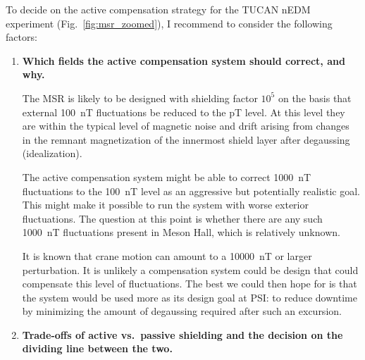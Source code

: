 To decide on the active compensation strategy for the TUCAN nEDM experiment (Fig.~\ref{fig:msr_zoomed}), I recommend to consider the following factors:
\begin{enumerate}

    \item {\bf Which fields the active compensation system should correct, and why.}

    The MSR is likely to be designed with shielding factor $10^5$ on the basis that external 100~nT fluctuations be reduced to the pT level.  At this level they are within the typical level of magnetic noise and drift arising from changes in the remnant magnetization of the innermost shield layer after degaussing (idealization).

    The active compensation system might be able to correct 1000~nT fluctuations to the 100~nT level as an aggressive but potentially realistic goal. This might make it possible to run the system with worse exterior fluctuations. The question at this point is whether there are any such 1000~nT fluctuations present in Meson Hall, which is relatively unknown.
    
    It is known that crane motion can amount to a 10000~nT or larger perturbation. It is unlikely a compensation system could be design that could compensate this level of fluctuations. The best we could then hope for is that the system would be used more as its design goal at PSI: to reduce downtime by minimizing the amount of degaussing required after such an excursion.

    \item {\bf Trade-offs of active vs.~passive shielding and the decision on the dividing line between the two.} 
    
    
    
    


\end{enumerate}
